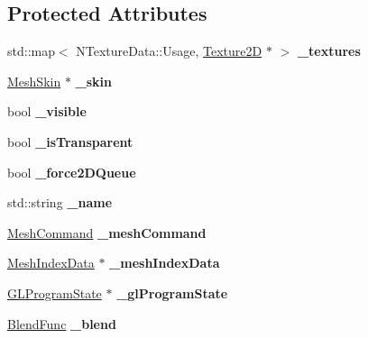 \subsection*{Protected Attributes}
\begin{DoxyCompactItemize}
\item 
\mbox{\label{classMesh_af06070fa117cd6f0148c170c803ea96a}} 
std\+::map$<$ N\+Texture\+Data\+::\+Usage, \hyperlink{classTexture2D}{Texture2D} $\ast$ $>$ {\bfseries \+\_\+textures}
\item 
\mbox{\label{classMesh_ae97b17f59cd6941f460fbfbbbcac98d8}} 
\hyperlink{classMeshSkin}{Mesh\+Skin} $\ast$ {\bfseries \+\_\+skin}
\item 
\mbox{\label{classMesh_a1e7d2e0711bc22aee5a120c761c99dec}} 
bool {\bfseries \+\_\+visible}
\item 
\mbox{\label{classMesh_adcc1e4fd2f9c05965c6dbd9e3b31889a}} 
bool {\bfseries \+\_\+is\+Transparent}
\item 
\mbox{\label{classMesh_a335b08e58a6b3f5b4c0ad128694da192}} 
bool {\bfseries \+\_\+force2\+D\+Queue}
\item 
\mbox{\label{classMesh_a556913beae21d0427bd8353815cf439e}} 
std\+::string {\bfseries \+\_\+name}
\item 
\mbox{\label{classMesh_a8fba460d731a55f9a656df3cc0a92ce6}} 
\hyperlink{classMeshCommand}{Mesh\+Command} {\bfseries \+\_\+mesh\+Command}
\item 
\mbox{\label{classMesh_a0d589188c16726af53583e4d09709a60}} 
\hyperlink{classMeshIndexData}{Mesh\+Index\+Data} $\ast$ {\bfseries \+\_\+mesh\+Index\+Data}
\item 
\mbox{\label{classMesh_a39ab16c299f21660977376862108d55e}} 
\hyperlink{classGLProgramState}{G\+L\+Program\+State} $\ast$ {\bfseries \+\_\+gl\+Program\+State}
\item 
\mbox{\label{classMesh_a4f74977fdcb6b6c0cea5e770c862de21}} 
\hyperlink{structBlendFunc}{Blend\+Func} {\bfseries \+\_\+blend}
\item 

\end{DoxyCompactItemize}
